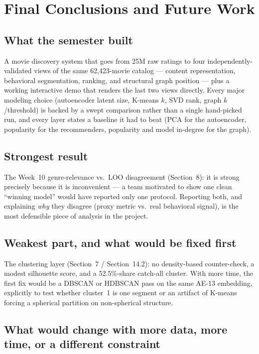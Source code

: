 \documentclass[12pt,a4paper]{article}
\begin{document}
\section{Final Conclusions and Future Work}

\subsection{What the semester built}

A movie discovery system that goes from 25M raw ratings to four independently-validated views of
the same 62,423-movie catalog --- content representation, behavioral segmentation, ranking, and
structural graph position --- plus a working interactive demo that renders the last two views
directly. Every major modeling choice (autoencoder latent size, K-means $k$, SVD rank, graph
$k$/threshold) is backed by a swept comparison rather than a single hand-picked run, and every layer
states a baseline it had to beat (PCA for the autoencoder, popularity for the recommenders,
popularity and model in-degree for the graph).

\subsection{Strongest result}

The Week~10 genre-relevance vs.\ LOO disagreement (Section~8): it is strong precisely because it is
inconvenient --- a team motivated to show one clean ``winning model'' would have reported only one
protocol. Reporting both, and explaining \emph{why} they disagree (proxy metric vs.\ real
behavioral signal), is the most defensible piece of analysis in the project.

\subsection{Weakest part, and what would be fixed first}

The clustering layer (Section~7 / Section~14.2): no density-based counter-check, a modest
silhouette score, and a 52.5\%-share catch-all cluster. With more time, the first fix would be a
DBSCAN or HDBSCAN pass on the same AE-13 embedding, explicitly to test whether cluster~1 is one
segment or an artifact of K-means forcing a spherical partition on non-spherical structure.

\subsection{What would change with more data, more time, or a different constraint}
\end{document}
